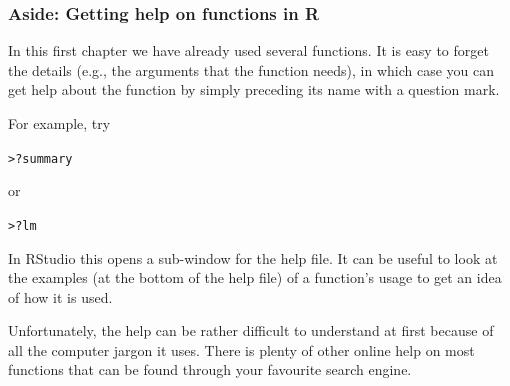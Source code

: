 \documentclass{beamer}\usepackage[]{graphicx}\usepackage[]{xcolor}
\makeatletter
\newcommand{\hlopt}[1]{\textcolor[rgb]{0,0,0}{#1}}%
\newcommand{\hlstd}[1]{\textcolor[rgb]{0.345,0.345,0.345}{#1}}%
\newenvironment{kframe}{%
 \def\at@end@of@kframe{}%
 \ifinner\ifhmode%
  \def\at@end@of@kframe{\end{minipage}}%
  \begin{minipage}{\columnwidth}%
 \fi\fi%
 \def\FrameCommand##1{\hskip\@totalleftmargin \hskip-\fboxsep
 \colorbox{shadecolor}{##1}\hskip-\fboxsep
     \hskip-\linewidth \hskip-\@totalleftmargin \hskip\columnwidth}%
 \MakeFramed {\advance\hsize-\width
   \@totalleftmargin\z@ \linewidth\hsize
   \@setminipage}}%
 {\par\unskip\endMakeFramed%
 \at@end@of@kframe}
\newenvironment{knitrout}{}{} %
\makeatother
\begin{document}
\begin{frame}[fragile]
\frametitle{Aside: Getting help on functions in R}

In this first chapter we have already used several  functions. It is easy to forget the details (e.g., the arguments that the function needs), in which case you can get help about the function by simply preceding its name with a question mark.

For example, try
\begin{knitrout}\scriptsize
{}\color{fgcolor}\begin{kframe}
\begin{alltt}
\hlstd{> }\hlopt{?}\hlstd{summary}
\end{alltt}
\end{kframe}
\end{knitrout}
\vspace{-0.5em}

or
\begin{knitrout}\scriptsize
{}\color{fgcolor}\begin{kframe}
\begin{alltt}
\hlstd{> }\hlopt{?}\hlstd{lm}
\end{alltt}
\end{kframe}
\end{knitrout}

In RStudio this opens a sub-window for the help file. It can be useful to look at the examples (at the bottom of the help file) of a function's usage to get an idea of how it is used.

Unfortunately, the  help can be rather difficult to understand at first because of all the computer jargon it uses. There is plenty of other online help on most  functions that can be found through your favourite search engine.

\end{frame}
\end{document}
